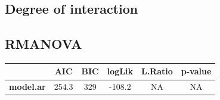 \documentclass[]{article}
\begin{document}
\newpage

\subsection{Degree of interaction}\label{degree-of-interaction}

\subsection{RMANOVA}\label{rmanova}

\begin{longtable}[]{@{}cccccc@{}}
\toprule
\begin{minipage}[b]{0.21\columnwidth}\centering\strut
~
\strut\end{minipage} &
\begin{minipage}[b]{0.07\columnwidth}\centering\strut
AIC
\strut\end{minipage} &
\begin{minipage}[b]{0.07\columnwidth}\centering\strut
BIC
\strut\end{minipage} &
\begin{minipage}[b]{0.10\columnwidth}\centering\strut
logLik
\strut\end{minipage} &
\begin{minipage}[b]{0.12\columnwidth}\centering\strut
L.Ratio
\strut\end{minipage} &
\begin{minipage}[b]{0.12\columnwidth}\centering\strut
p-value
\strut\end{minipage}\tabularnewline
\midrule
\endhead
\begin{minipage}[t]{0.21\columnwidth}\centering\strut
\textbf{model.ar}
\strut\end{minipage} &
\begin{minipage}[t]{0.07\columnwidth}\centering\strut
254.3
\strut\end{minipage} &
\begin{minipage}[t]{0.07\columnwidth}\centering\strut
329
\strut\end{minipage} &
\begin{minipage}[t]{0.10\columnwidth}\centering\strut
-108.2
\strut\end{minipage} &
\begin{minipage}[t]{0.12\columnwidth}\centering\strut
NA
\strut\end{minipage} &
\begin{minipage}[t]{0.12\columnwidth}\centering\strut
NA
\strut\end{minipage}\tabularnewline

\end{longtable}
\end{document}
